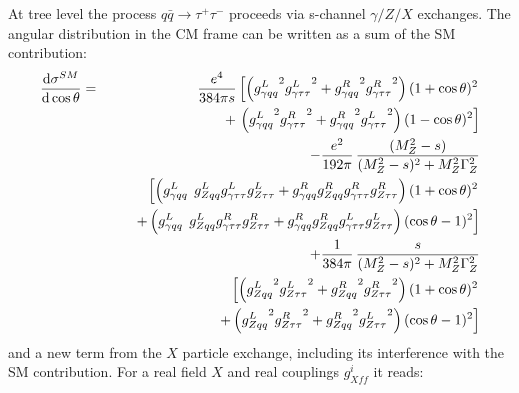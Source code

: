 \documentclass[12pt]{article}
\newcommand\nn{\nonumber}
\begin{document}
At tree level the process $q\bar q\to \tau^+\tau^-$ proceeds via s-channel $\gamma/Z/X$ exchanges. 
The angular distribution in the CM frame can be written as a sum of the SM contribution:
%
\begin{eqnarray}
\frac{{\rm d}\sigma^{SM}}{{\rm d}\cos\theta}&= 
& \frac{e^4}{384 \pi  s} 
\left[\left({g^L_{\gamma qq}}^2 {g^L_{\gamma \tau \tau}}^2+
{g^R_{\gamma qq}}^2 {g^R_{\gamma \tau \tau}}^2\right)
(1+\cos\theta )^2\right. \nn \\
&&\phantom{M}+\left.
\left({g^L_{\gamma qq}}^2 {g^R_{\gamma \tau \tau}}^2+
{g^R_{\gamma qq}}^2 {g^L_{\gamma \tau \tau}}^2\right)
(1-\cos\theta)^2
\right]\nn \\
  && -\frac{e^2}{192\pi}\, \frac{
(M^2_Z-s)} { 
(M_Z^2-s)^2+M_Z^2\Gamma_Z^2}  \nn \\
&& 
\phantom{M}\left[\left({g^L_{\gamma qq}}^{\phantom{1}}
g^L_{Zqq} g^L_{\gamma \tau \tau} g^L_{Z\tau\tau}
+g^R_{\gamma qq}g^R_{Zqq} g^R_{\gamma \tau \tau} g^R_{Z\tau\tau}\right)
(1+\cos\theta)^2 \right. \nn  \\
&& \phantom{Ma}
 \left.  +\left({g^L_{\gamma qq}}^{\phantom{1}}g^L_{Zqq} g^R_{\gamma \tau \tau} g^R_{Z\tau\tau}
+g^R_{\gamma qq}g^R_{Zqq} g^L_{\gamma \tau \tau} g^L_{Z\tau\tau}\right)
  (\cos\theta-1)^2\right] \nn \\
&& +\frac{1}{384\pi}\, \frac{s}{ 
(M_Z^2-s)^2+M_Z^2\Gamma_Z^2}\nn \\
  &&
\phantom{M}\left[\left({g^L_{Zqq}}^2 {g^L_{Z\tau\tau}}^2 +{g^R_{Zqq}}^2 {g^R_{Z\tau\tau}}^2\right)
  (1+\cos\theta)^2 \right. \nn \\
&& \phantom{Ma} \left.  +\left({g^L_{Zqq}}^2 {g^R_{Z\tau\tau}}^2 
+{g^R_{Zqq}}^2 {g^L_{Z\tau\tau}}^2\right) (\cos\theta-1)^2 \right]\label{eq:SM}
\end{eqnarray}
%
and a new term from the $X$ particle exchange, including its interference with the SM contribution. 
For a real field $X$ and real couplings $g^i_{Xff}$ it reads:
%
\end{document}
